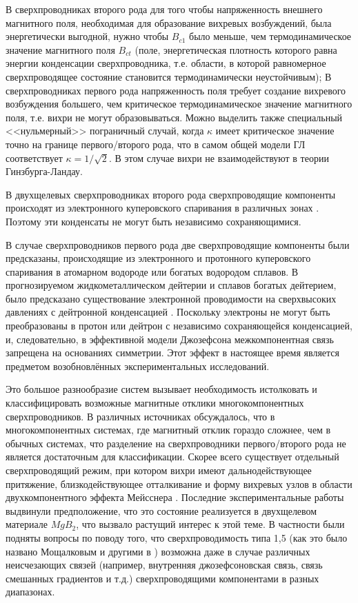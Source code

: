 В сверхпроводниках второго рода для того чтобы напряженность внешнего 
магнитного поля, необходимая для образование вихревых возбуждений, была 
энергетически выгодной, нужно чтобы \( B_{c1} \) было меньше, чем 
термодинамическое значение магнитного поля \( B_{ct} \) (поле, энергетическая 
плотность которого равна энергии конденсации сверхпроводника, т.е. области, в 
которой равномерное сверхпроводящее состояние становится термодинамически 
неустойчивым); В сверхпроводниках первого рода напряженность поля требует 
создание вихревого возбуждения большего, чем критическое термодинамическое 
значение магнитного поля, т.е. вихри не могут образовываться. Можно выделить 
также специальный <<нульмерный>> пограничный случай, когда \( \kappa \) имеет 
критическое значение точно на границе первого/второго рода, что в самом общей 
модели ГЛ соответствует \( \kappa = 1/\sqrt{2} \). В этом случае вихри не 
взаимодействуют в теории Гинзбурга-Ландау.

В двухщелевых сверхпроводниках второго рода сверхпроводящие компоненты 
происходят из электронного куперовского спаривания в различных зонах 
\cite{bib:6}. Поэтому эти конденсаты не могут быть независимо сохраняющимися.

В случае сверхпроводников первого рода две сверхпроводящие компоненты были 
предсказаны, происходящие из электронного и протонного куперовского спаривания 
в атомарном водороде или богатых водородом сплавов. В прогнозируемом 
жидкометаллическом дейтерии и сплавов богатых дейтерием, было предсказано 
существование электронной проводимости на сверхвысоких давлениях с дейтронной 
конденсацией  \cite{bib:12.1,bib:12.2,bib:13,bib:14}. Поскольку электроны не 
могут быть преобразованы в протон или дейтрон с независимо сохраняющейся 
конденсацией, и, следовательно, в эффективной модели Джозефсона 
межкомпонентная связь запрещена на основаниях симметрии. Этот эффект в 
настоящее время является предметом возобновлённых экспериментальных 
исследований.

Это большое разнообразие систем вызывает необходимость истолковать и 
классифицировать возможные магнитные отклики многокомпонентных 
сверхпроводников. В различных источниках обсуждалось, что в многокомпонентных 
системах, где магнитный отклик гораздо сложнее, чем в обычных системах, что 
разделение на сверхпроводники первого/второго рода не является достаточным для 
классификации. Скорее всего существует отдельный сверхпроводящий режим, при 
котором вихри имеют дальнодействующее притяжение, близкодействующее 
отталкивание и форму вихревых узлов в области двухкомпонентного эффекта 
Мейсснера \cite{bib:1,bib:2}. Последние экспериментальные работы 
\cite{bib:16,bib:17} выдвинули предположение, что это состояние реализуется в 
двухщелевом материале \( MgB_2 \), что вызвало растущий интерес к этой теме. В 
частности были подняты вопросы по поводу того, что сверхпроводимость типа 1,5 
(как это было названо Мощалковым и другими в \cite{bib:16}) возможна даже в 
случае различных неисчезающих связей (например, внутренняя джозефсоновская 
связь, связь смешанных градиентов и т.д.) сверхпроводящими компонентами в 
разных диапазонах. \cite{bib:main}

